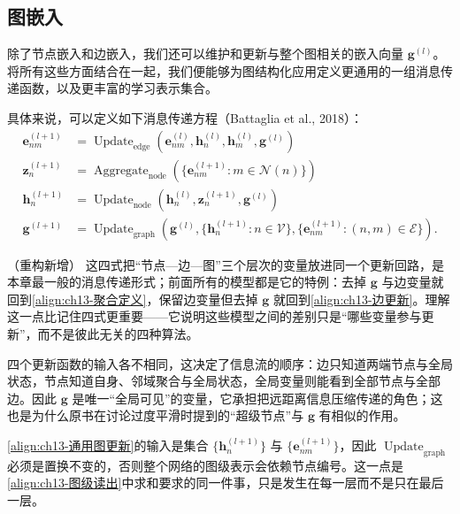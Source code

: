 \documentclass[../../main.tex]{subfiles}
\begin{document}
\subsection{图嵌入}\label{subsection:ch13-图嵌入}

除了节点嵌入和边嵌入，我们还可以维护和更新与整个图相关的嵌入向量 $\bm{g}^{(l)}$。将所有这些方面结合在一起，我们便能够为图结构化应用定义更通用的一组消息传递函数，以及更丰富的学习表示集合。

\begin{definition}[通用图网络的消息传递方程]\label{definition:ch13-通用消息传递}
具体来说，可以定义如下消息传递方程（Battaglia et al., 2018）：
\begin{align}
\bm{e}_{nm}^{(l+1)}&=\operatorname{Update}_{\mathrm{edge}}\!\left(\bm{e}_{nm}^{(l)},\bm{h}_n^{(l)},\bm{h}_m^{(l)},\bm{g}^{(l)}\right)
\label{align:ch13-通用边更新}\\
\bm{z}_n^{(l+1)}&=\operatorname{Aggregate}_{\mathrm{node}}\!\left(\{\bm{e}_{nm}^{(l+1)}:m\in\mathcal{N}(n)\}\right)
\label{align:ch13-通用边聚合}\\
\bm{h}_n^{(l+1)}&=\operatorname{Update}_{\mathrm{node}}\!\left(\bm{h}_n^{(l)},\bm{z}_n^{(l+1)},\bm{g}^{(l)}\right)
\label{align:ch13-通用节点更新}\\
\bm{g}^{(l+1)}&=\operatorname{Update}_{\mathrm{graph}}\!\left(\bm{g}^{(l)},\{\bm{h}_n^{(l+1)}:n\in\mathcal{V}\},\{\bm{e}_{nm}^{(l+1)}:(n,m)\in\mathcal{E}\}\right).
\label{align:ch13-通用图更新}
\end{align}
\end{definition}

\begin{remark}（重构新增）
这四式把“节点—边—图”三个层次的变量放进同一个更新回路，是本章最一般的消息传递形式；前面所有的模型都是它的特例：去掉 $\bm{g}$ 与边变量就回到\eqref{align:ch13-聚合定义}，保留边变量但去掉 $\bm{g}$ 就回到\eqref{align:ch13-边更新}。理解这一点比记住四式更重要——它说明这些模型之间的差别只是“哪些变量参与更新”，而不是彼此无关的四种算法。\par
四个更新函数的输入各不相同，这决定了信息流的顺序：边只知道两端节点与全局状态，节点知道自身、邻域聚合与全局状态，全局变量则能看到全部节点与全部边。因此 $\bm{g}$ 是唯一“全局可见”的变量，它承担把远距离信息压缩传递的角色；这也是为什么原书在讨论过度平滑时提到的“超级节点”与 $\bm{g}$ 有相似的作用。\par
\eqref{align:ch13-通用图更新}的输入是集合 $\{\bm{h}_n^{(l+1)}\}$ 与 $\{\bm{e}_{nm}^{(l+1)}\}$，因此 $\operatorname{Update}_{\mathrm{graph}}$ 必须是置换不变的，否则整个网络的图级表示会依赖节点编号。这一点是\eqref{align:ch13-图级读出}中求和要求的同一件事，只是发生在每一层而不是只在最后一层。
\end{remark}
\end{document}
